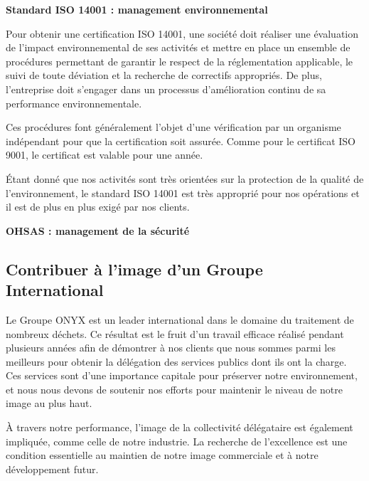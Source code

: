 \textbf{Standard ISO 14001 : management environnemental}
\vspace{0.3cm}


Pour obtenir une certification ISO 14001, une société doit réaliser une évaluation de l’impact environnemental de ses activités et mettre en place un ensemble de procédures permettant de garantir le respect de la réglementation applicable, le suivi de toute déviation et la recherche de correctifs appropriés. De plus, l’entreprise doit s’engager dans un processus d’amélioration continu de sa performance environnementale.
\vspace{0.3cm} 

Ces procédures font généralement l’objet d’une vérification par un organisme indépendant pour que la certification soit assurée. Comme pour le certificat ISO 9001, le certificat est valable pour une année.
\vspace{0.3cm} 

Étant donné que nos activités sont très orientées sur la protection de la qualité de l’environnement, le standard ISO 14001 est très approprié pour nos opérations et il est de plus en plus exigé par nos clients.

\vspace{0.3cm}

\textbf{	OHSAS : management de la sécurité}
\vspace{0.3cm}

\subsection{	Contribuer à l'image d'un Groupe International}

Le Groupe ONYX est un leader international dans le domaine du traitement de nombreux déchets. Ce résultat est le fruit d’un travail efficace réalisé pendant plusieurs années afin de démontrer à nos clients que nous sommes parmi les meilleurs pour obtenir la délégation des services publics dont ils ont la charge. Ces services sont d’une importance capitale pour préserver notre environnement, et nous nous devons de soutenir nos efforts pour maintenir le niveau de notre image au plus haut.
\vspace{0.3cm} 

À travers notre performance, l’image de la collectivité délégataire est également impliquée, comme celle de notre industrie. La recherche de l’excellence est une condition essentielle au maintien de notre image commerciale et à notre développement futur.

